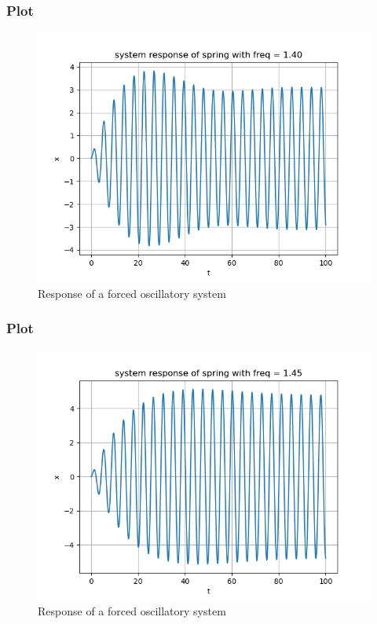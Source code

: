 \documentclass[11pt]{article}
\begin{document}
\subsubsection{Plot}
\begin{figure}[H]
    \centering
    \includegraphics[scale = 1]{Figure_3.png}
    \caption{Response of a forced oscillatory system}
\end{figure}

\subsubsection{Plot}
\begin{figure}[H]
    \centering
    \includegraphics[scale = 1]{Figure_4.png}
    \caption{Response of a forced oscillatory system}
\end{figure}
\end{document}
